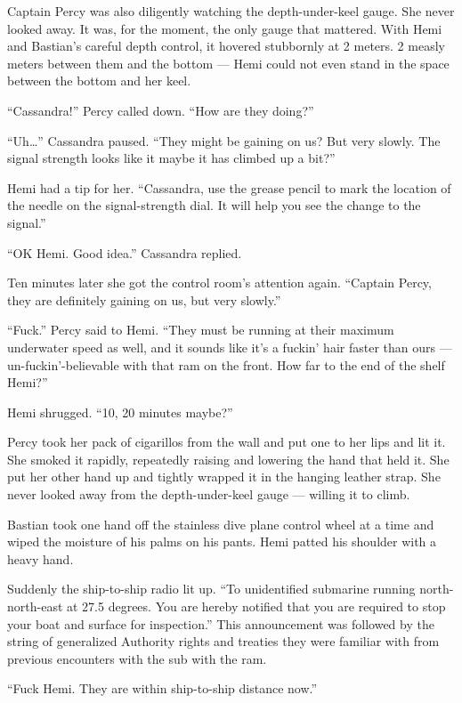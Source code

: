 \documentclass[
]{scrbook}
\begin{document}
Captain Percy was also diligently watching the depth-under-keel gauge.
She never looked away. It was, for the moment, the only gauge that
mattered. With Hemi and Bastian's careful depth control, it hovered
stubbornly at 2 meters. 2 measly meters between them and the bottom ---
Hemi could not even stand in the space between the bottom and her keel.

``Cassandra!'' Percy called down. ``How are they doing?''

``Uh\ldots{}'' Cassandra paused. ``They might be gaining on us? But very
slowly. The signal strength looks like it maybe it has climbed up a
bit?''

Hemi had a tip for her. ``Cassandra, use the grease pencil to mark the
location of the needle on the signal-strength dial. It will help you see
the change to the signal.''

``OK Hemi. Good idea.'' Cassandra replied.

Ten minutes later she got the control room's attention again. ``Captain
Percy, they are definitely gaining on us, but very slowly.''

``Fuck.'' Percy said to Hemi. ``They must be running at their maximum
underwater speed as well, and it sounds like it's a fuckin' hair faster
than ours --- un-fuckin'-believable with that ram on the front. How far
to the end of the shelf Hemi?''

Hemi shrugged. ``10, 20 minutes maybe?''

Percy took her pack of cigarillos from the wall and put one to her lips
and lit it. She smoked it rapidly, repeatedly raising and lowering the
hand that held it. She put her other hand up and tightly wrapped it in
the hanging leather strap. She never looked away from the
depth-under-keel gauge --- willing it to climb.

Bastian took one hand off the stainless dive plane control wheel at a
time and wiped the moisture of his palms on his pants. Hemi patted his
shoulder with a heavy hand.

Suddenly the ship-to-ship radio lit up. ``To unidentified submarine
running north-north-east at 27.5 degrees. You are hereby notified that
you are required to stop your boat and surface for inspection.'' This
announcement was followed by the string of generalized Authority rights
and treaties they were familiar with from previous encounters with the
sub with the ram.

``Fuck Hemi. They are within ship-to-ship distance now.''
\end{document}
